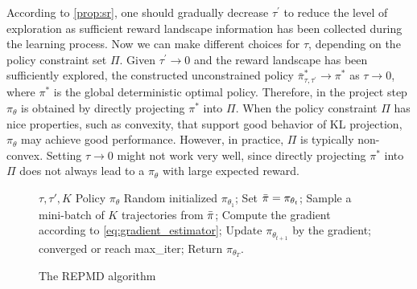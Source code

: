 According to \cref{prop:sr}, one should gradually decrease $\tau^{\prime}$ to reduce the level of exploration as sufficient reward landscape information has been collected during the learning process. Now we can make different choices for $\tau$, depending on the policy constraint set $\Pi$.
Given $\tau^{\prime} \to 0$ and the reward landscape has been sufficiently explored,
the constructed unconstrained policy $\bar{\pi}_{\tau,\tau^{\prime}}^* \to \pi^*$ as $\tau \to 0$, where $\pi^*$ is the global deterministic optimal policy. 
Therefore, in the project step $\pi_\theta$ is obtained by directly projecting $\pi^*$ into $\Pi$. When the policy constraint $\Pi$ has nice properties, such as convexity, that support good behavior of KL projection, $\pi_\theta$ may achieve good performance.
However, in practice, $\Pi$ is typically non-convex. Setting $\tau \to 0$ might not work very well, since directly projecting $\pi^*$ into $\Pi$ does not always lead to a $\pi_\theta$ with large expected reward.
\begin{figure}
	\begin{minipage}{0.56\textwidth}
		\begin{algorithm}[H]
			\caption{\label{alg:repmd}  The REPMD algorithm}
			\begin{algorithmic}[1]
				\INPUT $\tau, \tau', K$
				\OUTPUT  Policy $\pi_\theta$
				\STATE Random initialized $\pi_{\theta_1}$;
				\STATE Set $\bar{\pi} = \pi_{\theta_t}$;
				\REPEAT 
				\STATE Sample a mini-batch of $K$ trajectories from $\bar{\pi}$;
				\STATE Compute the gradient according to \cref{eq:gradient_estimator};
				\STATE Update $\pi_{\theta_{t+1}}$ by the gradient;
				\UNTIL converged or reach max\_iter;
				\ENDFOR
				\STATE Return $\pi_{\theta_T}$.
			\end{algorithmic}
		\end{algorithm}
	\end{minipage}
\end{figure}


